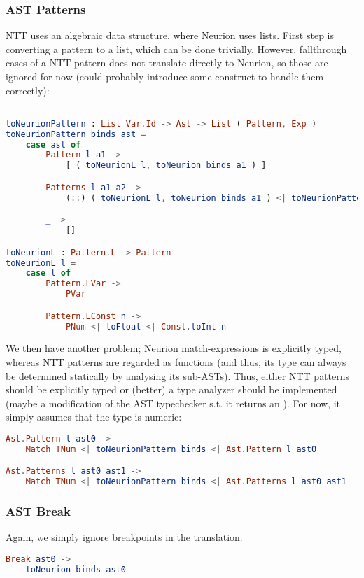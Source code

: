 \documentclass[10pt,a4paper,english]{article}
\begin{document}
\subsubsection*{AST Patterns}
NTT uses an algebraic data structure, where Neurion uses lists. First step is converting a pattern to a list, which can be done trivially. However, fallthrough cases of a NTT pattern does not translate directly to Neurion, so those are ignored for now (could probably introduce some construct to handle them correctly):
\begin{lstlisting}[language=elm,%
                     label="eval-evaluated",%
                     gobble=0,%
                     ]

toNeurionPattern : List Var.Id -> Ast -> List ( Pattern, Exp )
toNeurionPattern binds ast =
    case ast of
        Pattern l a1 ->
            [ ( toNeurionL l, toNeurion binds a1 ) ]

        Patterns l a1 a2 ->
            (::) ( toNeurionL l, toNeurion binds a1 ) <| toNeurionPattern binds a2

        _ ->
            []

toNeurionL : Pattern.L -> Pattern
toNeurionL l =
    case l of
        Pattern.LVar ->
            PVar

        Pattern.LConst n ->
            PNum <| toFloat <| Const.toInt n
\end{lstlisting}
We then have another problem; Neurion match-expressions is explicitly typed, whereas NTT patterns are regarded as functions (and thus, its type can always be determined statically by analysing its sub-ASTs). Thus, either NTT patterns should be explicitly typed or (better) a type analyzer should be implemented (maybe a modification of the AST typechecker s.t. it returns an \actx). For now, it simply assumes that the type is numeric:
\begin{lstlisting}[language=elm,%
                     label="eval-evaluated",%
                     gobble=0,%
                     ]
Ast.Pattern l ast0 ->
    Match TNum <| toNeurionPattern binds <| Ast.Pattern l ast0

Ast.Patterns l ast0 ast1 ->
    Match TNum <| toNeurionPattern binds <| Ast.Patterns l ast0 ast1
\end{lstlisting}
\subsubsection*{AST Break}
Again, we simply ignore breakpoints in the translation.
\begin{lstlisting}[language=elm,%
                     label="eval-evaluated",%
                     gobble=0,%
                     ]
Break ast0 ->
    toNeurion binds ast0
\end{lstlisting}
\end{document}

